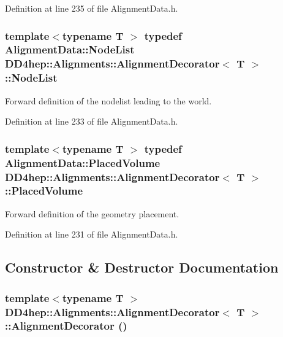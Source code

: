 Definition at line 235 of file AlignmentData.h.\hypertarget{class_d_d4hep_1_1_alignments_1_1_alignment_decorator_aedab1bae256b0583734ed4325c58a7a7}{
\subsubsection[{NodeList}]{\setlength{\rightskip}{0pt plus 5cm}template$<$typename T $>$ typedef {\bf AlignmentData::NodeList} {\bf DD4hep::Alignments::AlignmentDecorator}$<$ {\bf T} $>$::{\bf NodeList}}}
\label{class_d_d4hep_1_1_alignments_1_1_alignment_decorator_aedab1bae256b0583734ed4325c58a7a7}


Forward definition of the nodelist leading to the world. 

Definition at line 233 of file AlignmentData.h.\hypertarget{class_d_d4hep_1_1_alignments_1_1_alignment_decorator_a3dc9016a6686627ec2e6584aed9c8eeb}{
\subsubsection[{PlacedVolume}]{\setlength{\rightskip}{0pt plus 5cm}template$<$typename T $>$ typedef {\bf AlignmentData::PlacedVolume} {\bf DD4hep::Alignments::AlignmentDecorator}$<$ {\bf T} $>$::{\bf PlacedVolume}}}
\label{class_d_d4hep_1_1_alignments_1_1_alignment_decorator_a3dc9016a6686627ec2e6584aed9c8eeb}


Forward definition of the geometry placement. 

Definition at line 231 of file AlignmentData.h.

\subsection{Constructor \& Destructor Documentation}
\hypertarget{class_d_d4hep_1_1_alignments_1_1_alignment_decorator_af15dc8788db4b9f8ffdaa366b88bd85b}{
\subsubsection[{AlignmentDecorator}]{\setlength{\rightskip}{0pt plus 5cm}template$<$typename T $>$ {\bf DD4hep::Alignments::AlignmentDecorator}$<$ {\bf T} $>$::{\bf AlignmentDecorator} ()}}
\label{class_d_d4hep_1_1_alignments_1_1_alignment_decorator_af15dc8788db4b9f8ffdaa366b88bd85b}


